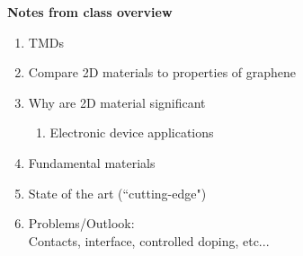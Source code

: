 \documentclass{article}
\begin{document}
\textbf{Notes from class overview}
\begin{enumerate} %
	\item{TMDs}

	\item{Compare 2D materials to properties of graphene}

	\item{Why are 2D material significant}
	\begin{enumerate} %
		\item{Electronic device applications}
	\end{enumerate} %

	\item{Fundamental materials}

	\item{State of the art (``cutting-edge")}

	\item{Problems/Outlook:\\
		Contacts, interface, controlled doping, etc...}


\end{enumerate} %



\end{document}
